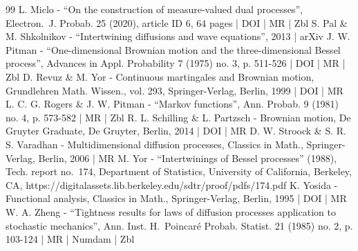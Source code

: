 \begin{thebibliography}{99}
L. Miclo - “On the construction of measure-valued dual processes”, Electron. J. Probab. 25 (2020), article ID 6, 64 pages | DOI | MR | Zbl
S. Pal \& M. Shkolnikov - “Intertwining diffusions and wave equations”, 2013 | arXiv
J. W. Pitman - “One-dimensional Brownian motion and the three-dimensional Bessel process”, Advances in Appl. Probability 7 (1975) no. 3, p. 511-526 | DOI | MR | Zbl
D. Revuz \& M. Yor - Continuous martingales and Brownian motion, Grundlehren Math. Wissen., vol. 293, Springer-Verlag, Berlin, 1999 | DOI | MR
L. C. G. Rogers \& J. W. Pitman - “Markov functions”, Ann. Probab. 9 (1981) no. 4, p. 573-582 | MR | Zbl
R. L. Schilling \& L. Partzsch - Brownian motion, De Gruyter Graduate, De Gruyter, Berlin, 2014 | DOI | MR
D. W. Stroock \& S. R. S. Varadhan - Multidimensional diffusion processes, Classics in Math., Springer-Verlag, Berlin, 2006 | MR
M. Yor - “Intertwinings of Bessel processes” (1988), Tech. report no. 174, Department of Statistics, University of California, Berkeley, CA, https://digitalassets.lib.berkeley.edu/sdtr/proof/pdfs/174.pdf
K. Yosida - Functional analysis, Classics in Math., Springer-Verlag, Berlin, 1995 | DOI | MR
W. A. Zheng - “Tightness results for laws of diffusion processes application to stochastic mechanics”, Ann. Inst. H. Poincaré Probab. Statist. 21 (1985) no. 2, p. 103-124 | MR | Numdam | Zbl
\end{thebibliography}
